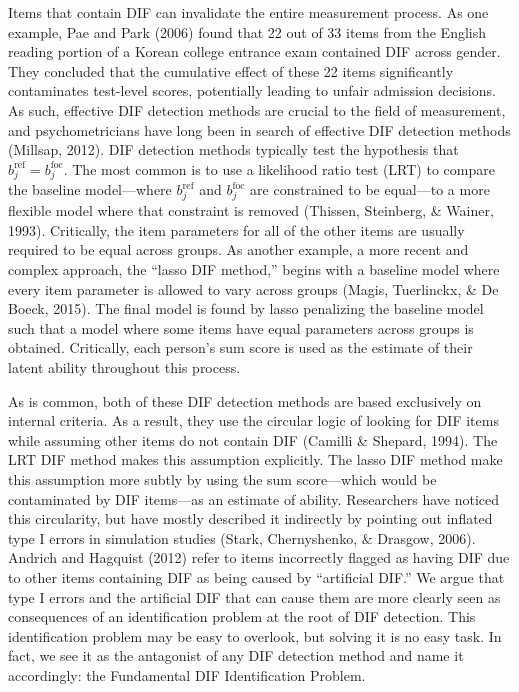 \documentclass[
  english,
  man,floatsintext]{apa6}
\begin{document}
Items that contain DIF can invalidate the entire measurement process. As one example, Pae and Park (2006) found that 22 out of 33 items from the English reading portion of a Korean college entrance exam contained DIF across gender. They concluded that the cumulative effect of these 22 items significantly contaminates test-level scores, potentially leading to unfair admission decisions. As such, effective DIF detection methods are crucial to the field of measurement, and psychometricians have long been in search of effective DIF detection methods (Millsap, 2012). DIF detection methods typically test the hypothesis that \(b_j^{\text{ref}} = b_j^{\text{foc}}\). The most common is to use a likelihood ratio test (LRT) to compare the baseline model---where \(b_j^{\text{ref}}\) and \(b_j^{\text{foc}}\) are constrained to be equal---to a more flexible model where that constraint is removed (Thissen, Steinberg, \& Wainer, 1993). Critically, the item parameters for all of the other items are usually required to be equal across groups. As another example, a more recent and complex approach, the ``lasso DIF method,'' begins with a baseline model where every item parameter is allowed to vary across groups (Magis, Tuerlinckx, \& De Boeck, 2015). The final model is found by lasso penalizing the baseline model such that a model where some items have equal parameters across groups is obtained. Critically, each person's sum score is used as the estimate of their latent ability throughout this process.

As is common, both of these DIF detection methods are based exclusively on internal criteria. As a result, they use the circular logic of looking for DIF items while assuming other items do not contain DIF (Camilli \& Shepard, 1994). The LRT DIF method makes this assumption explicitly. The lasso DIF method make this assumption more subtly by using the sum score---which would be contaminated by DIF items---as an estimate of ability. Researchers have noticed this circularity, but have mostly described it indirectly by pointing out inflated type I errors in simulation studies (Stark, Chernyshenko, \& Drasgow, 2006). Andrich and Hagquist (2012) refer to items incorrectly flagged as having DIF due to other items containing DIF as being caused by ``artificial DIF.'' We argue that type I errors and the artificial DIF that can cause them are more clearly seen as consequences of an identification problem at the root of DIF detection. This identification problem may be easy to overlook, but solving it is no easy task. In fact, we see it as the antagonist of any DIF detection method and name it accordingly: the Fundamental DIF Identification Problem.
\end{document}

